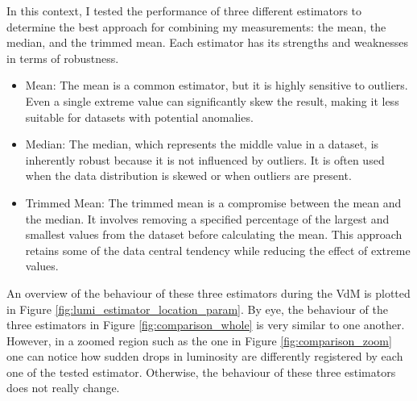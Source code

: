In this context, I tested the performance of three different estimators to determine the best approach for combining my measurements: the mean, the median, and the trimmed mean. Each estimator has its strengths and weaknesses in terms of robustness.

\begin{itemize}
\item Mean: The mean is a common estimator, but it is highly sensitive to outliers. Even a single extreme value can significantly skew the result, making it less suitable for datasets with potential anomalies.
\item Median: The median, which represents the middle value in a dataset, is inherently robust because it is not influenced by outliers. It is often used when the data distribution is skewed or when outliers are present.
\item Trimmed Mean: The trimmed mean is a compromise between the mean and the median. It involves removing a specified percentage of the largest and smallest values from the dataset before calculating the mean. This approach retains some of the data central tendency while reducing the effect of extreme values.
\end{itemize}


An overview of the behaviour of these three estimators during the VdM is plotted in Figure \ref{fig:lumi_estimator_location_param}. By eye, the behaviour of the three estimators in Figure \ref{fig:comparison_whole} is very similar to one another. However, in a zoomed region such as the one in Figure \ref{fig:comparison_zoom} one can notice how sudden drops in luminosity are differently registered by each one of the tested estimator. Otherwise, the behaviour of these three estimators does not really change.
 

